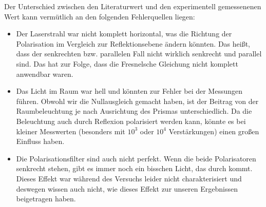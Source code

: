 		Der Unterschied zwischen den Literaturwert und den experimentell gemessenenen Wert kann vermütlich an den folgenden Fehlerquellen liegen:
		\begin{itemize}
			\item Der Laserstrahl war nicht komplett horizontal, was die Richtung der Polarisation im Vergleich zur Reflektionsebene ändern könnten. Das heißt, dass der senkrechten bzw. parallelen Fall nicht wirklich senkrecht und parallel sind. Das hat zur Folge, dass die Fresnelsche Gleichung nicht komplett anwendbar waren. 
			\item Das Licht im Raum war hell und könnten zur Fehler bei der Messungen führen. Obwohl wir die Nullausgleich gemacht haben, ist der Beitrag von der Raumbeleuchtung je nach Ausrichtung des Prismas unterschiedlich. Da die Beleuchtung auch durch Reflexion polarisiert werden kann, könnte es bei kleiner Messwerten (besonders mit $10^3$ oder $10^4$ Verstärkungen) einen großen Einfluss haben.
			\item Die Polarisationsfilter sind auch nicht perfekt. Wenn die beide Polarisatoren senkrecht stehen, gibt es immer noch ein bisschen Licht, das durch kommt. Dieses Effekt war während des Versuchs leider nicht charakterisiert und deswegen wissen auch nicht, wie dieses Effekt zur unseren Ergebnissen beigetragen haben.
		\end{itemize}
